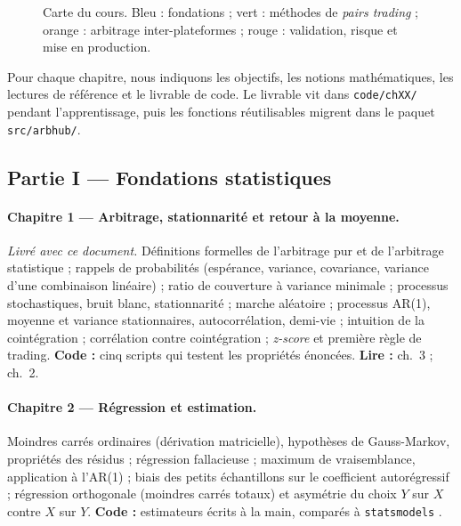 \documentclass[11pt,a4paper]{article}
\begin{document}
\begin{figure}[h]
\caption{Carte du cours. Bleu : fondations ; vert : méthodes de \emph{pairs trading} ; orange : arbitrage inter-plateformes ; rouge : validation, risque et mise en production.}
\label{fig:map}
\end{figure}

Pour chaque chapitre, nous indiquons les objectifs, les notions mathématiques, les lectures de référence et le livrable de code. Le livrable vit dans \texttt{code/chXX/} pendant l'apprentissage, puis les fonctions réutilisables migrent dans le paquet \texttt{src/arbhub/}.

\subsection{Partie I — Fondations statistiques}

\paragraph{Chapitre 1 — Arbitrage, stationnarité et retour à la moyenne.} \emph{Livré avec ce document.}
Définitions formelles de l'arbitrage pur et de l'arbitrage statistique \citep{hogan2004} ; rappels de probabilités (espérance, variance, covariance, variance d'une combinaison linéaire) ; ratio de couverture à variance minimale ; processus stochastiques, bruit blanc, stationnarité ; marche aléatoire ; processus AR(1), moyenne et variance stationnaires, autocorrélation, demi-vie ; intuition de la cointégration \citep{murray1994} ; corrélation contre cointégration ; \emph{z-score} et première règle de trading. \textbf{Code :} cinq scripts qui testent les propriétés énoncées. \textbf{Lire :} \citet{hamilton1994} ch.~3 ; \citet{chan2013} ch.~2.

\paragraph{Chapitre 2 — Régression et estimation.}
Moindres carrés ordinaires (dérivation matricielle), hypothèses de Gauss-Markov, propriétés des résidus ; régression fallacieuse \citep{granger1974} ; maximum de vraisemblance, application à l'AR(1) ; biais des petits échantillons sur le coefficient autorégressif ; régression orthogonale (moindres carrés totaux) et asymétrie du choix $Y$ sur $X$ contre $X$ sur $Y$. \textbf{Code :} estimateurs écrits à la main, comparés à \texttt{statsmodels} \citep{statsmodels}.
\end{document}
